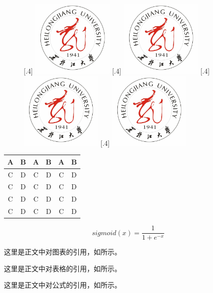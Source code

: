 \begin{figure}[h]
    \centering
    [.4\textwidth]
        {\includegraphics[width=40mm]{img/hlju_logo.jpg}}
    [.4\textwidth]
        {\includegraphics[width=40mm]{img/hlju_logo.jpg}}
    [.4\textwidth]
        {\includegraphics[width=40mm]{img/hlju_logo.jpg}}
    [.4\textwidth]
        {\includegraphics[width=40mm]{img/hlju_logo.jpg}}
    \label{Fig:1}
\end{figure}

\begin{table}[h]
    \label{Tab:1}
    \centering
    \begin{tabular}{cccccc}
        \toprule
        A & B &A & B &A & B\\
        \midrule
        C & D & C & D & C & D\\
        C & D & C & D & C & D\\
        C & D & C & D & C & D\\
        C & D & C & D & C & D\\
        \bottomrule
    \end{tabular}
\end{table}


\begin{equation}
    sigmoid(x)=\frac{1}{1+e^{-x}}
    \label{Eq:1}
\end{equation}

这里是正文中对图表的引用，如所示。

这里是正文中对表格的引用，如所示。

这里是正文中对公式的引用，如所示。
